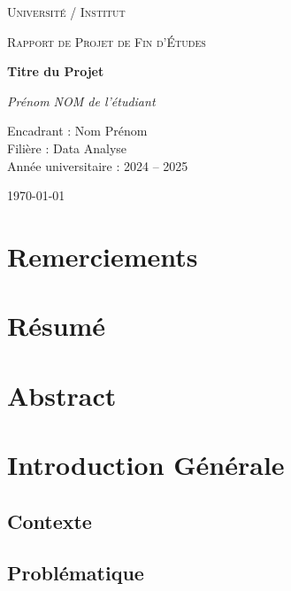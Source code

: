 \documentclass[12pt,a4paper]{report}
\begin{document}
\begin{titlepage}
    \centering
    {\scshape\LARGE Université / Institut \par}
    \vspace{1cm}
    {\scshape\Large Rapport de Projet de Fin d'Études \par}
    \vspace{1.5cm}
    {\huge\bfseries Titre du Projet \par}
    \vspace{2cm}
    {\Large\itshape Prénom NOM de l'étudiant \par}
    \vfill
    Encadrant : Nom Prénom\\
    Filière : Data Analyse\\
    Année universitaire : 2024 -- 2025
    \vfill
    {\large \today\par}
\end{titlepage}

\chapter*{Remerciements}
\lipsum[1]

\chapter*{Résumé}
\lipsum[2]

\chapter*{Abstract}
\lipsum[2]

\tableofcontents
\newpage

\chapter{Introduction Générale}
\section{Contexte}
\section{Problématique}
\end{document}
